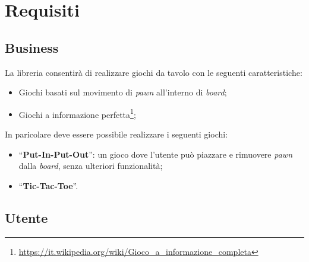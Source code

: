 \section{Requisiti}




\subsection{Business}

La libreria consentirà di realizzare giochi da tavolo con le seguenti caratteristiche:

\begin{itemize}
    \item Giochi basati sul movimento di \textit{pawn} all'interno di \textit{board};
    \item Giochi a informazione perfetta\footnote{\url{https://it.wikipedia.org/wiki/Gioco_a_informazione_completa}};
\end{itemize}

In paricolare deve essere possibile realizzare i seguenti giochi:

\begin{itemize}
    \item ``\textbf{Put-In-Put-Out}'': un gioco dove l'utente può piazzare e rimuovere \textit{pawn} dalla \textit{board}, senza ulteriori funzionalità;
    \item ``\textbf{Tic-Tac-Toe}''.
\end{itemize}

\subsection{Utente}

